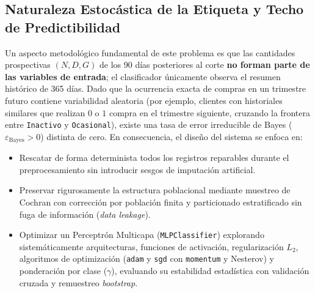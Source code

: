 \documentclass[11pt,a4paper]{article}
\newcommand{\code}[1]{\texttt{\small #1}}
\begin{document}
\subsection{Naturaleza Estocástica de la Etiqueta y Techo de Predictibilidad}
Un aspecto metodológico fundamental de este problema es que las cantidades prospectivas $(N, D, G)$ de los 90 días posteriores al corte \textbf{no forman parte de las variables de entrada}; el clasificador únicamente observa el resumen histórico de 365 días. Dado que la ocurrencia exacta de compras en un trimestre futuro contiene variabilidad aleatoria (por ejemplo, clientes con historiales similares que realizan $0$ o $1$ compra en el trimestre siguiente, cruzando la frontera entre \code{Inactivo} y \code{Ocasional}), existe una tasa de error irreducible de Bayes ($\varepsilon_{\text{Bayes}} > 0$) distinta de cero. En consecuencia, el diseño del sistema se enfoca en:
\begin{itemize}[noitemsep]
    \item Rescatar de forma determinista todos los registros reparables durante el preprocesamiento sin introducir sesgos de imputación artificial.
    \item Preservar rigurosamente la estructura poblacional mediante muestreo de Cochran con corrección por población finita y particionado estratificado sin fuga de información (\textit{data leakage}).
    \item Optimizar un Perceptrón Multicapa (\code{MLPClassifier}) explorando sistemáticamente arquitecturas, funciones de activación, regularización $L_2$, algoritmos de optimización (\code{adam} y \code{sgd} con \code{momentum} y Nesterov) y ponderación por clase ($\gamma$), evaluando su estabilidad estadística con validación cruzada y remuestreo \textit{bootstrap}.
\end{itemize}
\end{document}
